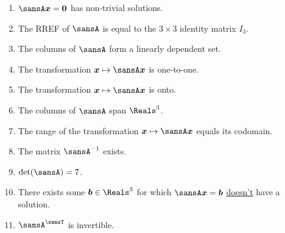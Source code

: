 \documentclass[12 pt]{article}
\begin{document}
\begin{enumerate}[leftmargin=0in, rightmargin=-0.25in]
	\begin{enumerate}[topsep=3mm,itemsep=14mm]
		\item $\sansA\vect{x}=\vect{0}$ has non-trivial solutions.
		\item The RREF of $\sansA$ is equal to the $3\times3$ identity matrix $I_3$.
		\item The columns of $\sansA$ form a linearly dependent set.
		\item The transformation $\vect{x}\mapsto\sansA\vect{x}$ is one-to-one.
		\item The transformation $\vect{x}\mapsto\sansA\vect{x}$ is onto.
		\item The columns of $\sansA$ span $\Reals^3$.
		\item The range of the transformation $\vect{x}\mapsto\sansA\vect{x}$ equals its codomain.
		\item The matrix $\sansA^{-1}$ exists.
		\item $\det(\sansA)=7$.
		\item There exists some $\vect{b}\in\Reals^3$ for which $\sansA\vect{x}=\vect{b}$ \ul{doesn't} have a solution.
		\item $\sansA^\sansT$ is invertible.
	\end{enumerate}
\end{enumerate}
\end{document}
